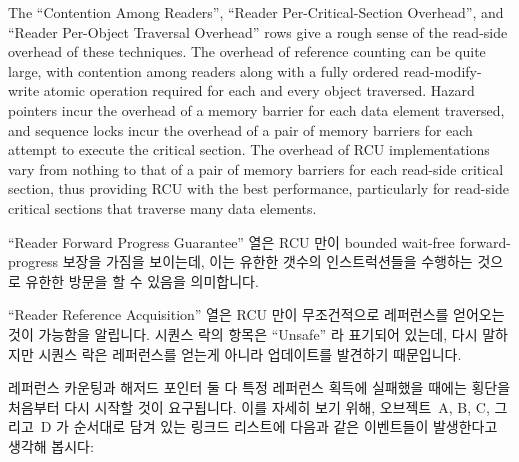 The ``Contention Among Readers'', ``Reader Per-Critical-Section Overhead'',
and ``Reader Per-Object Traversal Overhead'' rows give a rough sense of
the read-side overhead of these techniques.
The overhead of reference counting can be quite large, with
contention among readers along with a fully ordered read-modify-write
atomic operation required for each and every object traversed.
Hazard pointers incur the overhead of a memory barrier for each data element
traversed, and sequence locks incur the overhead of a pair of memory barriers
for each attempt to execute the critical section.
The overhead of RCU implementations vary from nothing to that of a pair of
memory barriers for each read-side critical section, thus providing RCU
with the best performance, particularly for read-side critical sections
that traverse many data elements.
\fi

``Reader Forward Progress Guarantee'' 열은 RCU 만이 bounded wait-free
forward-progress 보장을 가짐을 보이는데, 이는 유한한 갯수의 인스트럭션들을
수행하는 것으로 유한한 방문을 할 수 있음을 의미합니다.

``Reader Reference Acquisition'' 열은 RCU 만이 무조건적으로 레퍼런스를 얻어오는
것이 가능함을 알립니다.
시퀀스 락의 항목은 ``Unsafe'' 라 표기되어 있는데, 다시 말하지만 시퀀스 락은
레퍼런스를 얻는게 아니라 업데이트를 발견하기 때문입니다.
\iffalse

The ``Reader Forward Progress Guarantee'' row shows that only RCU
has a bounded wait-free forward-progress guarantee, which means that
it can carry out a finite traversal by executing a bounded number of
instructions.

The ``Reader Reference Acquisition'' rows indicates that only RCU is
capable of unconditionally acquiring references.
The entry for sequence locks is ``Unsafe'' because, again, sequence locks
detect updates rather than acquiring references.
\fi

레퍼런스 카운팅과 해저드 포인터 둘 다 특정 레퍼런스 획득에 실패했을 때에는
횡단을 처음부터 다시 시작할 것이 요구됩니다.
이를 자세히 보기 위해, 오브젝트~A, B, C, 그리고~D 가 순서대로 담겨 있는 링크드
리스트에 다음과 같은 이벤트들이 발생한다고 생각해 봅시다:
\iffalse

Reference counting and hazard pointers both require that traversals be
restarted from the beginning if a given acquisition fails.
To see this, consider a linked list containing objects~A, B, C, and~D,
in that order, and the following series of events:
\fi

